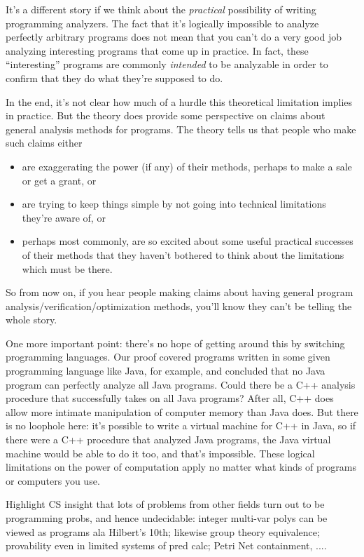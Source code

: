 It's a different story if we think about the \emph{practical}
possibility of writing programming analyzers.  The fact that it's
logically impossible to analyze perfectly arbitrary programs does not
mean that you can't do a very good job analyzing interesting programs
that come up in practice.  In fact, these ``interesting'' programs are
commonly \emph{intended} to be analyzable in order to confirm that
they do what they're supposed to do.

In the end, it's not clear how much of a hurdle this theoretical limitation
implies in practice.  But the theory does provide some perspective
on claims about general analysis methods for programs.  The theory
tells us that people who make such claims either

\begin{itemize}
\item are exaggerating the power (if any) of their methods, perhaps to make a
  sale or get a grant, or

\item are trying to keep things simple by not going into technical
  limitations they're aware of, or

\item perhaps most commonly, are so excited about some useful practical
    successes of their methods that they haven't bothered to think about
    the limitations which must be there.
\end{itemize}

So from now on, if you hear people making claims about having general
program analysis/verification/optimization methods, you'll know they can't
be telling the whole story.

One more important point: there's no hope of getting around this by
switching programming languages.  Our proof covered programs written
in some given programming language like Java, for example, and
concluded that no Java program can perfectly analyze all Java
programs.  Could there be a C++ analysis procedure that successfully
takes on all Java programs?  After all, C++ does allow more intimate
manipulation of computer memory than Java does.  But there is no
loophole here: it's possible to write a virtual machine for C++ in
Java, so if there were a C++ procedure that analyzed Java programs,
the Java virtual machine would be able to do it too, and that's
impossible.  These logical limitations on the power of computation
apply no matter what kinds of programs or computers you use.

\begin{editingnotes}
Highlight CS insight that lots of problems from other fields turn out
to be programming probs, and hence undecidable: integer
multi-var polys can be viewed as programs ala Hilbert's 10th; likewise
group theory equivalence; provability even in limited systems of pred
calc; Petri Net containment, ....
\end{editingnotes}

